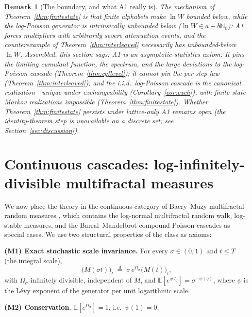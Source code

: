 \documentclass[pdflatex,sn-mathphys-num]{sn-jnl}
\theoremstyle{thmstyleone}
\theoremstyle{thmstyletwo}
\newtheorem*{remark}{Remark}
\theoremstyle{thmstylethree}
\begin{document}
\begin{remark}[The boundary, and what A1 really is]
The mechanism of Theorem~\ref{thm:finitestate} is that finite
alphabets make $\ln W$ bounded below, while the log-Poisson
generator is intrinsically unbounded below ($\ln W \in a +
b\mathbb{N}_0$): A1 forces multipliers with arbitrarily severe
attenuation events, and the counterexample of
Theorem~\ref{thm:interleaved} necessarily has unbounded-below
$\ln W$.  Assembled, this section says: A1 is an
\emph{asymptotic-statistics} axiom.  It pins the limiting cumulant
function, the spectrum, and the large deviations to the log-Poisson
cascade (Theorem~\ref{thm:cgflevel}); it cannot pin the per-step law
(Theorem~\ref{thm:interleaved}); and the i.i.d.\ log-Poisson cascade
is the canonical realization---unique under exchangeability
(Corollary~\ref{cor:exch}), with finite-state Markov realizations
impossible (Theorem~\ref{thm:finitestate}).  Whether
Theorem~\ref{thm:finitestate} persists under lattice-only A1
remains open (the identity-theorem step is unavailable on a discrete
set; see Section~\ref{sec:discussion}).
\end{remark}


\section{Continuous cascades: log-infinitely-divisible multifractal
measures}
\label{sec:mrm}

We now place the theory in the continuous category of Bacry--Muzy
multifractal random measures \cite{BM03,MB02}, which contains the
log-normal multifractal random walk, log-stable measures, and the
Barral--Mandelbrot compound Poisson cascades \cite{BM02} as special
cases.  We use two structural properties of the class as axioms:

\smallskip
\noindent\textbf{(M1) Exact stochastic scale invariance.}  For every
$\sigma \in (0,1)$ and $t \le T$ (the integral scale),
\[
  \bigl(M(\sigma t)\bigr)_t \;\stackrel{d}{=}\;
  \sigma\,e^{\Omega_\sigma}\bigl(M(t)\bigr)_t,
\]
with $\Omega_\sigma$ infinitely divisible, independent of $M$, and
$\mathbb{E}[e^{q\Omega_\sigma}] = \sigma^{-\psi(q)}$, where $\psi$
is the L\'evy exponent of the generator per unit logarithmic scale.

\smallskip
\noindent\textbf{(M2) Conservation.}  $\mathbb{E}[e^{\Omega_\sigma}]
= 1$, i.e.\ $\psi(1) = 0$.
\end{document}
